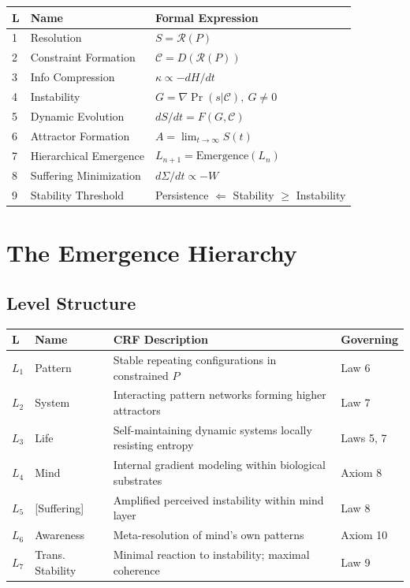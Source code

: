 \documentclass[12pt, a4paper]{article}
\begin{document}
\begin{center}
\renewcommand{\arraystretch}{1.3}
\begin{tabular}{p{0.5cm} p{3.5cm} p{8cm}}
\toprule
\textbf{L} & \textbf{Name} & \textbf{Formal Expression} \\
\midrule
1 & Resolution & $S = \mathcal{R}(P)$ \\
2 & Constraint Formation & $\mathcal{C} = D(\mathcal{R}(P))$ \\
3 & Info Compression & $\kappa \propto -dH/dt$ \\
4 & Instability & $G = \nabla\Pr(s|\mathcal{C}),\ G \neq 0$ \\
5 & Dynamic Evolution & $dS/dt = F(G,\mathcal{C})$ \\
6 & Attractor Formation & $A = \lim_{t\to\infty}S(t)$ \\
7 & Hierarchical Emergence & $L_{n+1} = \mathrm{Emergence}(L_n)$ \\
8 & Suffering Minimization & $d\Sigma/dt \propto -W$ \\
9 & Stability Threshold & Persistence $\Leftarrow$ Stability $\geq$ Instability \\
\bottomrule
\end{tabular}
\end{center}

\section{The Emergence Hierarchy}

\subsection{Level Structure}

\begin{center}
\renewcommand{\arraystretch}{1.3}
\begin{tabular}{p{0.6cm} p{2.8cm} p{5.5cm} p{3cm}}
\toprule
\textbf{L} & \textbf{Name} & \textbf{CRF Description} & \textbf{Governing} \\
\midrule
$L_1$ & Pattern & Stable repeating configurations in constrained $P$ & Law 6 \\
$L_2$ & System & Interacting pattern networks forming higher attractors & Law 7 \\
$L_3$ & Life & Self-maintaining dynamic systems locally resisting entropy & Laws 5, 7 \\
$L_4$ & Mind & Internal gradient modeling within biological substrates & Axiom 8 \\
$L_5$ & [Suffering] & Amplified perceived instability within mind layer & Law 8 \\
$L_6$ & Awareness & Meta-resolution of mind's own patterns & Axiom 10 \\
$L_7$ & Trans. Stability & Minimal reaction to instability; maximal coherence & Law 9 \\
\bottomrule
\end{tabular}
\end{center}
\end{document}
